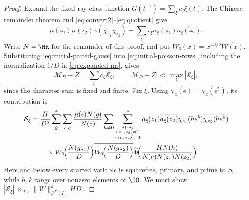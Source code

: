 \begin{proof}
Expand the fixed ray class function
$G(t^{-1})=\sum_\xi c_\xi\xi(t)$.
The Chinese remainder theorem and
\eqref{eq:convert2}--\eqref{eq:quotient} give
\begin{equation}\label{eq:initial-paired-gauss}
 \mu(z_1)\mu(z_2)
       \gamma(\overline{\chi_{z_1}}\chi_{z_2}) =\sum_\xi c_\xi a_\xi(z_1)\overline{a_\xi(z_2)}.
\end{equation}
Write $N=\NK$ for the remainder of this proof, and put
$W_0(x)=x^{-1/2}\overline{W(x)}$. Substituting
\eqref{eq:initial-paired-gauss} into \eqref{eq:initial-poisson-rows},
including the normalization $1/D$ in \eqref{eq:expanded-ms}, gives
\[
 \mathcal M_D-Z=\sum_\xi c_\xi\mathcal S_\xi,
 \qquad
 |\mathcal M_D-Z|\ll\max_\xi|\mathcal S_\xi|,
\]
since the character sum is fixed and finite. Fix $\xi$. Using
$\overline{\chi_z(e)}=\chi_z(e^5)$, its contribution is
\[
 \begin{aligned}
 \mathcal S_\xi
 ={}&\frac H{D^2}
 \sum_g^*\sum_{e\mid g}\frac{\mu(e)N(g)}{N(e)}
 \sum_{h\ne0}
 \sum_{\substack{z_1,z_2\\(z_1,z_2)=1\\(z_1z_2,g)=1}}^*
 a_\xi(z_1)\overline{a_\xi(z_2)}
 \chi_{z_1}(he^5)\overline{\chi_{z_2}(he^5)}
 \\
 &\quad{}\times
 W_0\!\Bigl(\frac{N(gz_1)}D\Bigr)
 \overline{W_0\!\Bigl(\frac{N(gz_2)}D\Bigr)}
 \widehat\Phi\!\Bigl(
 \frac{HN(h)}{N(e)N(z_1)N(z_2)}
 \Bigr).
 \end{aligned}
\]
Here and below every starred variable is squarefree, primary, and
prime to $S$, while $h,k$ range over nonzero elements of $\OO$.
We must show
$|\mathcal S_\xi|\ll_{I,\varepsilon}
\|W\|_{C^{J'}(I)}^2HD^\varepsilon$.


\end{proof}

